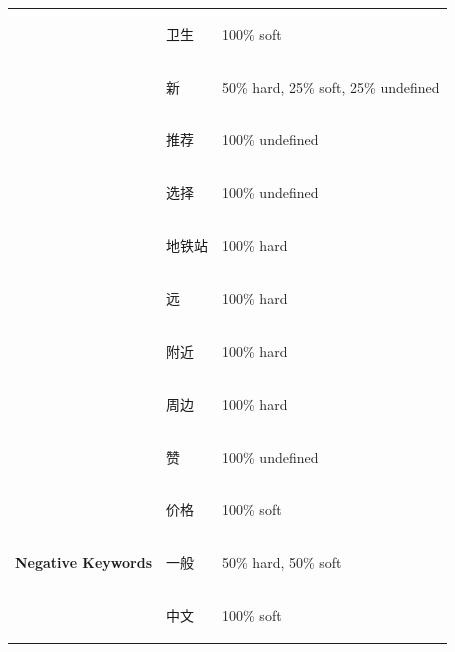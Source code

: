 \documentclass[smallextended,natbib]{svjour3}       %
\begin{document}
\begin{table}[ht]
{\begin{tabular}{|c|l|l|}
       & \begin{CJK}{UTF8}{gbsn}卫生\end{CJK}  & 100\% soft                           \\ \cline{2-3} 
       & \begin{CJK}{UTF8}{gbsn}新\end{CJK}   & 50\% hard, 25\% soft, 25\% undefined \\ \cline{2-3} 
       & \begin{CJK}{UTF8}{gbsn}推荐\end{CJK}  & 100\% undefined                      \\ \cline{2-3} 
       & \begin{CJK}{UTF8}{gbsn}选择\end{CJK}  & 100\% undefined                      \\ \cline{2-3} 
       & \begin{CJK}{UTF8}{gbsn}地铁站\end{CJK} & 100\% hard                           \\ \cline{2-3} 
       & \begin{CJK}{UTF8}{gbsn}远\end{CJK}   & 100\% hard                           \\ \cline{2-3} 
       & \begin{CJK}{UTF8}{gbsn}附近\end{CJK}  & 100\% hard                           \\ \cline{2-3} 
       & \begin{CJK}{UTF8}{gbsn}周边\end{CJK}  & 100\% hard                           \\ \cline{2-3} 
       & \begin{CJK}{UTF8}{gbsn}赞\end{CJK}   & 100\% undefined                      \\ \hline
      \multirow{8}{*}{\textbf{Negative Keywords}}  & \begin{CJK}{UTF8}{gbsn}价格\end{CJK}    & 100\% soft                                       \\ \cline{2-3} 
       & \begin{CJK}{UTF8}{gbsn}一般\end{CJK}  & 50\% hard, 50\% soft                 \\ \cline{2-3} 
       & \begin{CJK}{UTF8}{gbsn}中文\end{CJK}  & 100\% soft                           \\ \cline{2-3} 

\end{tabular}}
\end{table}
\end{document}
